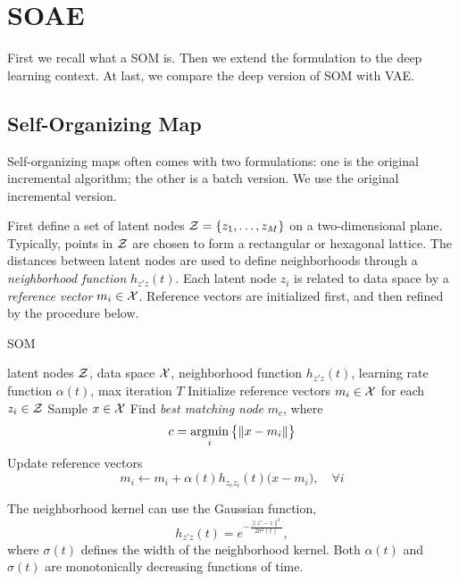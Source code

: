 \section{SOAE}\label{sec:soae}

First we recall what a SOM is.
Then we extend the formulation to the deep learning context.
At last,
we compare the deep version of SOM with VAE\@.

\subsection{Self-Organizing Map}

Self-organizing maps often comes with two formulations:
one is the original incremental algorithm;
the other is a batch version.
We use the original incremental version.

First define a set of latent nodes
\( \mathcal{Z}=\{z_1,\dots,z_M\} \)
on a two-dimensional plane.
Typically,
points in \( \mathcal{Z} \) are chosen to form a rectangular or hexagonal lattice.
The distances between latent nodes are used to define neighborhoods
through a \emph{neighborhood function} \( h_{z'z}(t) \).
Each latent node \( z_i \) is related to data space by a \emph{reference vector}
\( m_i\in\mathcal{X} \).
Reference vectors are initialized first,
and then refined by the procedure below.

\begin{algorithm}[tb]
    \caption{SOM~\cite{kohonen1982self, kohonen1998self}}\label{alg:example}
 \begin{algorithmic}
        latent nodes \(\mathcal{Z}\),
        data space \(\mathcal{X}\),
        neighborhood function \(h_{z'z}(t)\),
        learning rate function \(\alpha(t)\),
        max iteration \(T\)
    \STATE Initialize reference vectors \(m_i\in\mathcal{X}\) for each \(z_i\in\mathcal{Z}\)
    \STATE Sample \(x\in\mathcal{X}\)
    \STATE Find \emph{best matching node} \(m_c\),
        where
        \begin{equation}
            c = \mathop{\mathrm{argmin}}_i \big\{\|x-m_i\|\big\}
        \end{equation}
    \STATE Update reference vectors
        \begin{equation}
            m_i \leftarrow m_i + \alpha(t)h_{z_c z_i}(t)\big(x-m_i\big),\quad\forall i
        \end{equation}
    \ENDFOR
\end{algorithmic}
\end{algorithm}

The neighborhood kernel can use the Gaussian function,
\begin{equation}
    h_{z'z}(t) = e^{-\frac{\|z' - z\|^2}{2\sigma^2(t)}},
\end{equation}
where \(\sigma(t)\) defines the width of the neighborhood kernel.
Both \(\alpha(t)\) and \(\sigma(t)\) are monotonically decreasing functions of time.

